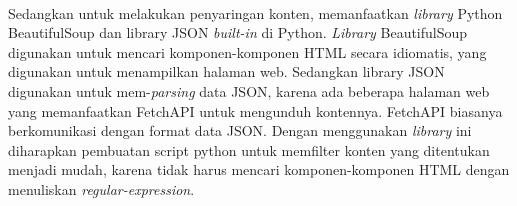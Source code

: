 \documentclass[./bab_3.tex]{subfiles}
\begin{document}
  \paragraph*{}Sedangkan untuk melakukan penyaringan konten,
  memanfaatkan \textit{library} Python BeautifulSoup dan
  library JSON \textit{built-in} di Python. \textit{Library}
  BeautifulSoup digunakan untuk mencari komponen-komponen
  HTML secara idiomatis, yang digunakan untuk menampilkan
  halaman web.
  Sedangkan library JSON digunakan untuk
  mem-\textit{parsing} data JSON, karena ada beberapa
  halaman web yang memanfaatkan FetchAPI untuk mengunduh
  kontennya. FetchAPI biasanya berkomunikasi dengan format
  data JSON. Dengan menggunakan \textit{library} ini
  diharapkan pembuatan script python untuk memfilter konten
  yang ditentukan menjadi mudah, karena tidak harus mencari
  komponen-komponen HTML dengan menuliskan
  \textit{regular-expression}.
\end{document}
